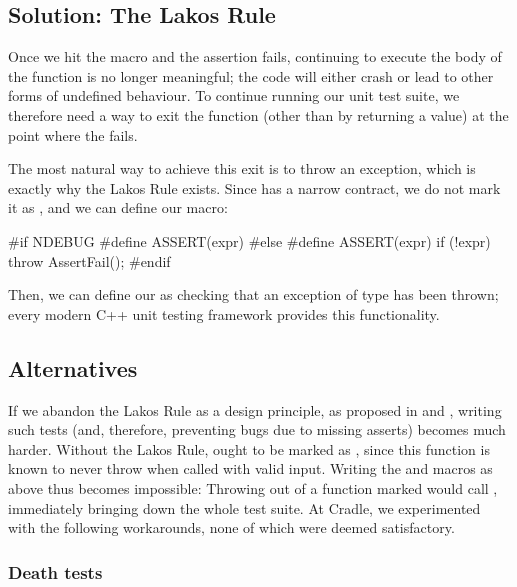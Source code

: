 \subsection{Solution: The Lakos Rule}
Once we hit the  macro and the assertion fails, continuing to execute the body of the function is no longer meaningful; the code will either crash or lead to other forms of undefined behaviour. To continue running our unit test suite, we therefore need a way to exit the function (other than by returning a value) at the point where the  fails.

The most natural way to achieve this exit is to throw an exception, which is exactly why the Lakos Rule exists. Since  has a narrow contract, we do not mark it as , and we can define our  macro:
\begin{codeblock}
#if NDEBUG
  #define ASSERT(expr)
#else
  #define ASSERT(expr) if (!expr) throw AssertFail();
#endif
\end{codeblock}
Then, we can define our  as checking that an exception of type  has been thrown; every modern C++ unit testing framework provides this functionality.

\subsection{Alternatives}

If we abandon the Lakos Rule as a design principle, as proposed in \cite{P1656R2} and \cite{P2148R0}, writing such tests (and, therefore, preventing bugs due to missing asserts) becomes much harder. Without the Lakos Rule,  ought to be marked as , since this function is known to never throw when called with valid input. Writing the  and  macros as above thus becomes impossible: Throwing  out of a function marked  would call , immediately bringing down the whole test suite. At Cradle, we experimented with the following workarounds, none of which were deemed satisfactory.

\subsubsection{Death tests}

